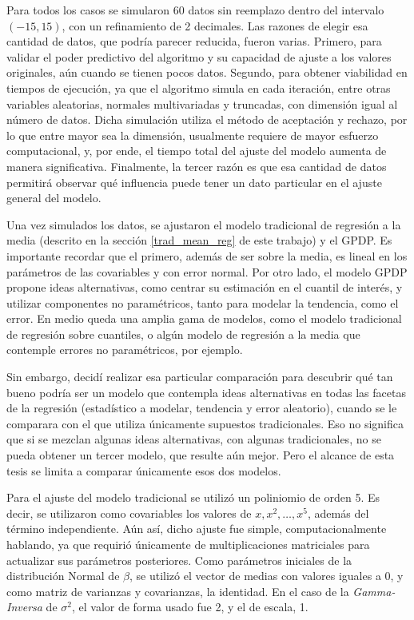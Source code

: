 Para todos los casos se simularon 60 datos sin reemplazo dentro del intervalo $(-15,15)$, con un refinamiento de 2 decimales. Las razones de elegir esa cantidad de datos, que podr\'ia parecer reducida, fueron varias. Primero, para validar el poder predictivo del algoritmo y su capacidad de ajuste a los valores originales, aún cuando se tienen pocos datos. Segundo, para obtener viabilidad en tiempos de ejecuci\'on, ya que el algoritmo simula en cada iteraci\'on, entre otras variables aleatorias, normales multivariadas y truncadas, con dimensi\'on igual al n\'umero de datos. Dicha simulaci\'on utiliza el m\'etodo de aceptaci\'on y rechazo, por lo que entre mayor sea la dimensi\'on, usualmente requiere de mayor esfuerzo computacional, y, por ende, el tiempo total del ajuste del modelo aumenta de manera significativa. Finalmente, la tercer raz\'on es que esa cantidad de datos permitir\'a observar qu\'e influencia puede tener un dato particular en el ajuste general del modelo.

Una vez simulados los datos, se ajustaron el modelo tradicional de regresi\'on a la media (descrito en la secci\'on \ref{trad_mean_reg} de este trabajo) y el GPDP. Es importante recordar que el primero, adem\'as de ser sobre la media, es lineal en los  par\'ametros de las covariables y con error normal. Por otro lado, el modelo GPDP propone ideas alternativas, como centrar su estimaci\'on en el cuantil de inter\'es, y utilizar componentes no param\'etricos, tanto para modelar la tendencia, como el error. En medio queda una amplia gama de modelos, como el modelo tradicional de regresi\'on sobre cuantiles, o alg\'un modelo de regresi\'on a la media que contemple errores no param\'etricos, por ejemplo. 

Sin embargo, decid\'i realizar esa particular comparaci\'on para descubrir qu\'e tan bueno podr\'ia ser un modelo que contempla ideas alternativas en todas las facetas de la regresi\'on (estad\'istico a modelar, tendencia y error aleatorio), cuando se le comparara con el que utiliza \'unicamente supuestos tradicionales. Eso no significa que si se mezclan algunas ideas alternativas, con algunas tradicionales, no se pueda obtener un tercer modelo, que resulte a\'un mejor. Pero el alcance de esta tesis se limita a comparar \'unicamente esos dos modelos.

Para el ajuste del modelo tradicional se utiliz\'o un poliniomio de orden 5. Es decir, se utilizaron como covariables los valores de $x, x^2, \ldots, x^5$, adem\'as del t\'ermino independiente. A\'un as\'i, dicho ajuste fue simple, computacionalmente hablando, ya que requiri\'o \'unicamente de multiplicaciones matriciales para actualizar sus par\'ametros posteriores. Como par\'ametros iniciales de la distribuci\'on Normal de $\beta$, se utiliz\'o el vector de medias con valores iguales a 0, y como matriz de varianzas y covarianzas, la identidad. En el caso de la \textit{Gamma-Inversa} de $\sigma^2$, el valor de forma usado fue 2, y el de escala, 1.

